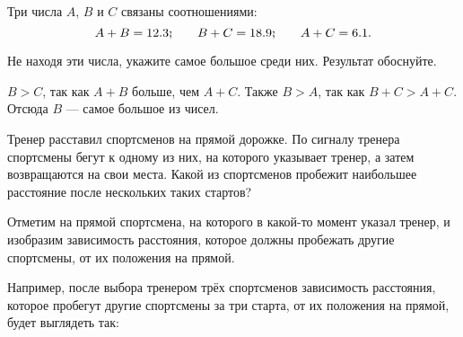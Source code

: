 \begin{itemize}

	\itB Три числа $A$, $B$ и $C$ связаны соотношениями:
	$$A+B = 12.3\scolon\qquad
		B+C=18.9\scolon\qquad
		A+C=6.1.$$

	Не находя эти числа, укажите самое большое среди них. Результат обоснуйте.
	
	\itr $B>C$, так как $A+B$ больше, чем $A+C$. Также $B>A$, так как $B+C>A+C$. Отсюда $B$ — самое большое из чисел.
	
	\itC Тренер расставил спортсменов на прямой дорожке. По сигналу тренера спортсмены бегут к одному из них, на которого указывает тренер, а затем возвращаются на свои места. Какой из спортсменов пробежит наибольшее расстояние после нескольких таких стартов?
	
	\itr Отметим на прямой спортсмена, на которого в какой-то момент указал тренер, и изобразим зависимость расстояния, которое должны пробежать другие спортсмены, от их положения на прямой.
	
	\begin{center}  \end{center}
	
	Например, после выбора тренером трёх спортсменов зависимость расстояния, которое пробегут другие спортсмены за три старта, от их положения на прямой, будет выглядеть так:
	
	\begin{center}  \end{center}
	

\end{itemize}
